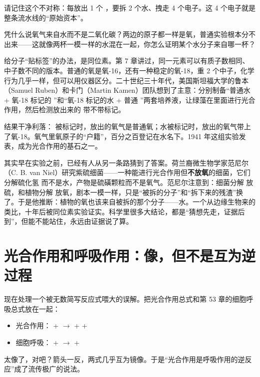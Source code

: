 请记住这个不对称：每放出 1 个 ，要拆 2 个水、拽走 4 个电子。这 4 个电子就是整条流水线的“原始资本”。

\begin{zhengju}
凭什么说氧气来自水而不是二氧化碳？两边的原子都一样是氧，普通实验根本分不出来——这就像两杯一模一样的水混在一起，你怎么证明某个水分子来自哪一杯？

给分子“贴标签”的办法，是同位素。第 7 章讲过，同一元素可以有质子数相同、中子数不同的版本。普通的氧是氧-16，还有一种稳定的氧-18，重 2 个中子，化学行为几乎一样，但可以用仪器区分。二十世纪三十年代，美国斯坦福大学的鲁本（Samuel Ruben）和卡门（Martin Kamen）团队想到了主意：分别制备“普通水 + 氧-18 标记的 ”和“氧-18 标记的水 + 普通 ”两套培养液，让绿藻在里面进行光合作用，然后检测放出来的  带不带标记。

结果干净利落： 被标记时，放出的氧气是普通氧；水被标记时，放出的氧气带上了氧-18。氧气里氧原子的“户籍”，百分之百登记在水名下。1941 年这组实验发表，成为光合作用的基石之一。

其实早在实验之前，已经有人从另一条路猜到了答案。荷兰裔微生物学家范尼尔（C. B. van Niel）研究紫硫细菌——一种能进行光合作用但\textbf{不放氧}的细菌，它们分解硫化氢  而不是水，产物是硫磺颗粒而不是氧气。范尼尔注意到：细菌分解  放硫，和植物分解  放氧，剧本一模一样，只是“被拆的分子”和“拆下来的残渣”换了。于是他推断：植物的氧也该来自被拆的那个分子——水。一个从边缘生物来的类比，十年后被同位素实验证实。科学里很多大结论，都是“猜想先走，证据后到”，但能不能站住，永远由证据说了算。
\end{zhengju}

\section{光合作用和呼吸作用：像，但不是互为逆过程}

现在处理一个被无数简写反应式喂大的误解。把光合作用总式和第 53 章的细胞呼吸总式放在一起：

\begin{itemize}[itemsep=2pt]
\item 光合作用： +  $\rightarrow$  +  + 
\item 细胞呼吸： +  $\rightarrow$  + 
\end{itemize}

太像了，对吧？箭头一反，两式几乎互为镜像。于是“光合作用是呼吸作用的逆反应”成了流传极广的说法。

